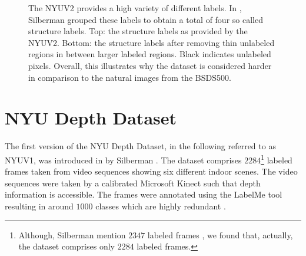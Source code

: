 \begin{figure}[t]
{	}
	\caption[Structure labels of the running examples as provided by the NYU Depth Dataset \cite{SilbermanHoiemKohliFergus:2012} and after removing small unlabeled regions in between larger labeled regions.]{The NYUV2 provides a high variety of different labels. In \cite{SilbermanHoiemKohliFergus:2012}, Silberman \etal grouped these labels to obtain a total of four so called structure labels. Top: the structure labels as provided by the NYUV2. Bottom: the structure labels after removing thin unlabeled regions in between larger labeled regions. Black indicates unlabeled pixels. Overall, this illustrates why the dataset is considered harder in comparison to the natural images from the BSDS500.}
	\label{fig:datasets-nyu-depth-dataset-labels}
\end{figure}
\section{NYU Depth Dataset}

The first version of the NYU Depth Dataset, in the following referred to as NYUV1, was introduced in \cite{SilbermanFergus:2011} by Silberman \etal. The dataset comprises $2284$\footnote{Although, Silberman \etal mention $2347$ labeled frames \cite{SilbermanFergus:2011}, we found that, actually, the dataset comprises only $2284$ labeled frames.} labeled frames taken from video sequences showing six different indoor scenes. The video sequences were taken by a calibrated Microsoft Kinect \cite{SilbermanFergus:2011} such that depth information is accessible. The frames were annotated using the LabelMe tool \cite{RussellTorralbaMurphyFreeman:2008} resulting in around $1000$ classes which are highly redundant \cite{SilbermanFergus:2011}.

